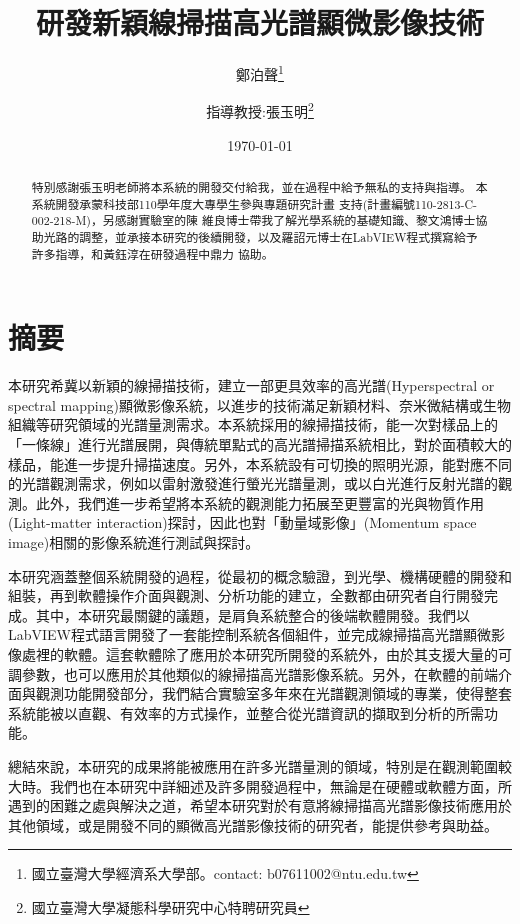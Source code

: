 \documentclass[12pt]{article}
\title{研發新穎線掃描高光譜顯微影像技術}
\author{鄭泊聲\thanks{國立臺灣大學經濟系大學部。contact: b07611002@ntu.edu.tw}
\and 指導教授:張玉明\thanks{國立臺灣大學凝態科學研究中心特聘研究員}}
\date{\today}
\begin{document}
\maketitle
{}
\begin{abstract}
    特別感謝張玉明老師將本系統的開發交付給我，並在過程中給予無私的支持與指導。
本系統開發承蒙科技部110學年度大專學生參與專題研究計畫
支持(計畫編號110-2813-C-002-218-M)，另感謝實驗室的陳
維良博士帶我了解光學系統的基礎知識、黎文鴻博士協助光路的調整，並承接本研究的後續開發，以及羅詔元博士在LabVIEW程式撰寫給予許多指導，和黃鈺淳在研發過程中鼎力
協助。
\end{abstract}

\newpage
\section*{摘要}
本研究希冀以新穎的線掃描技術，建立一部更具效率的高光譜(Hyperspectral or spectral mapping)顯微影像系統，以進步的技術滿足新穎材料、奈米微結構或生物組織等研究領域的光譜量測需求。本系統採用的線掃描技術，能一次對樣品上的「一條線」進行光譜展開，與傳統單點式的高光譜掃描系統相比，對於面積較大的樣品，能進一步提升掃描速度。另外，本系統設有可切換的照明光源，能對應不同的光譜觀測需求，例如以雷射激發進行螢光光譜量測，或以白光進行反射光譜的觀測。此外，我們進一步希望將本系統的觀測能力拓展至更豐富的光與物質作用(Light-matter interaction)探討，因此也對「動量域影像」(Momentum space image)相關的影像系統進行測試與探討。

本研究涵蓋整個系統開發的過程，從最初的概念驗證，到光學、機構硬體的開發和組裝，再到軟體操作介面與觀測、分析功能的建立，全數都由研究者自行開發完成。其中，本研究最關鍵的議題，是肩負系統整合的後端軟體開發。我們以LabVIEW程式語言開發了一套能控制系統各個組件，並完成線掃描高光譜顯微影像處裡的軟體。這套軟體除了應用於本研究所開發的系統外，由於其支援大量的可調參數，也可以應用於其他類似的線掃描高光譜影像系統。另外，在軟體的前端介面與觀測功能開發部分，我們結合實驗室多年來在光譜觀測領域的專業，使得整套系統能被以直觀、有效率的方式操作，並整合從光譜資訊的擷取到分析的所需功能。

總結來說，本研究的成果將能被應用在許多光譜量測的領域，特別是在觀測範圍較大時。我們也在本研究中詳細述及許多開發過程中，無論是在硬體或軟體方面，所遇到的困難之處與解決之道，希望本研究對於有意將線掃描高光譜影像技術應用於其他領域，或是開發不同的顯微高光譜影像技術的研究者，能提供參考與助益。

\noindent \textbf{}
\newpage
\end{document}
